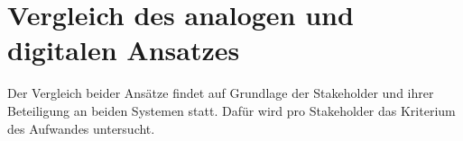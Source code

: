 \chapter{Vergleich des analogen und digitalen Ansatzes}

Der Vergleich beider Ansätze findet auf Grundlage der Stakeholder und ihrer Beteiligung an beiden Systemen statt. Dafür wird pro Stakeholder das Kriterium des Aufwandes untersucht.










